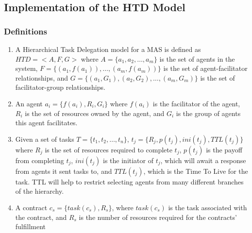 \documentclass[12pt,letterpaper,onecolumn]{article}
\begin{document}
	\subsection{Implementation of the HTD Model}
	\subsubsection{Definitions}
	\begin{enumerate}
		\item A Hierarchical Task Delegation model for a MAS is defined as $ HTD = <A, F, G> $ where $A = \{a_{1}, a_{2},\dots, a_{m}\}$ is the set of agents in the system, $F = \{(a_{1}, f(a_{1})), \dots, (a_{m}, f(a_{m}))\} $ is the set of agent-facilitator relationships, and $ G = \{(a_{1}, G_{1}), (a_{2}, G_{2}), \dots, (a_{m}, G_{m})\} $ is the set of facilitator-group relationships.
		
		\item An agent $a_{i} = \{f(a_{i}), R_{i}, G_{i}\} $ where $f(a_{i})$ is the facilitator of the agent, $ R_{i}$ is the set of resources owned by the agent, and $ G_{i}$ is the group of agents this agent facilitates.
		
		\item Given a set of tasks $T = \{t_{1}, t_{2}, \dots, t_{n}\} $, $t_{j} = \{R_{j}, p(t_{j}), ini(t_{j}), TTL(t_{j})\}$ where $R_{j}$ is the set of resources required to complete $t_{j}$, $p(t_{j})$ is the payoff from completing $t_{j}$, $ini(t_{j})$ is the initiator of $t_{j}$, which will await a response from agents it sent tasks to, and $ TTL(t_{j})$, which is the Time To Live for the task. TTL will help to restrict selecting agents from many different branches of the hierarchy.
		
		\item A contract $c_{s} = \{task(c_{s}), R_{s}\}$, where $task(c_{s})$ is the task associated with the contract, and $R_{s}$ is the number of resources required for the contracts' fulfillment
	\end{enumerate}
	
\end{document}
